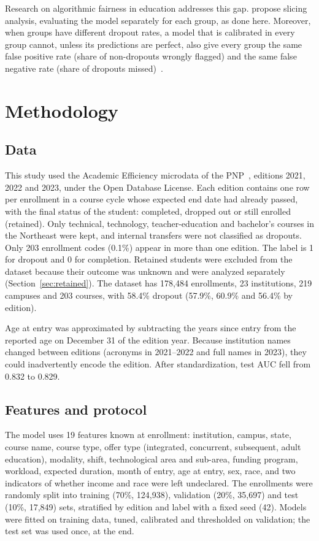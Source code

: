 \documentclass[12pt]{article}
\begin{document}
Research on algorithmic fairness in education addresses this gap. \cite{gardner2019} propose slicing analysis, evaluating the model separately for each group, as
done here. Moreover, when groups have
different dropout rates, a model that is calibrated in every group cannot, unless its predictions are perfect,
also give every group the same false positive rate (share of non-dropouts wrongly flagged) and the same false
negative rate (share of dropouts missed)~\cite{kleinberg2017,chouldechova2017}.

\section{Methodology}

\subsection{Data}

This study used the Academic Efficiency microdata of the PNP~\cite{pnp}, editions 2021, 2022 and 2023, under the Open Database
License. Each edition contains one row per enrollment in a course cycle whose expected end date had already passed, with the final status of the student: completed, dropped out or still
enrolled (retained). Only technical, technology, teacher-education and bachelor's courses in the Northeast were kept,
and internal transfers were not classified as dropouts. Only 203 enrollment codes (0.1\%) appear in more
than one edition. The label is 1 for dropout and 0 for completion. Retained
students were excluded from the dataset because their outcome was unknown and were analyzed separately (Section~\ref{sec:retained}). The dataset has 178,484 enrollments, 23 institutions, 219 campuses and 203 courses, with
58.4\% dropout (57.9\%, 60.9\% and 56.4\% by edition).

Age at entry was approximated by subtracting the years since entry from the reported age on December 31 of the
edition year. Because institution names changed between editions (acronyms in 2021--2022 and full names in 2023), they could
inadvertently encode the edition. After standardization, test AUC fell from 0.832 to 0.829.

\subsection{Features and protocol}

The model uses 19 features known at enrollment: institution, campus, state, course name, course type, offer type
(integrated, concurrent, subsequent, adult education), modality, shift, technological area and sub-area, funding
program, workload, expected duration, month of entry, age at entry, sex, race, and two indicators of whether income
and race were left undeclared. The enrollments were randomly split into training (70\%, 124,938), validation (20\%,
35,697) and test (10\%, 17,849) sets, stratified by edition and label with a fixed seed (42). Models were fitted on
training data, tuned, calibrated and thresholded on validation; the test set was used once, at the end.
\end{document}
